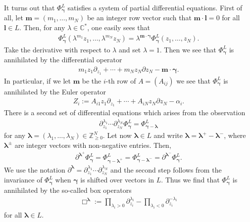 \documentclass[11pt]{article}
\numberwithin{equation}{section}
\numberwithin{equation}{section}
\begin{document}
It turns out that $\Phi_{\bm{\gamma}}^L$ satisfies a system of partial differential equations. First of all, let $\bm{m}=
(m_1,\dots,m_N)$ be an integer row vector such that $\bm{m}\cdot\bm{l}=0$ for all $\bm{l}\in L$.
Then, for any $\lambda \in \mathbb{C}^*$, one easily sees that
\begin{gather*}
\Phi_{\bm{\gamma}}^L(\lambda^{m_1}z_1,\dots,\lambda^{m_N}z_N)=
\lambda^{\bm{m}\cdot\bm{\gamma}}\Phi_{\bm{\gamma}}^L(z_1,\dots,z_N).
\end{gather*}
Take the derivative with respect to $\lambda$ and set $\lambda=1$. Then we see that
$\Phi_{\bm{\gamma}}^L$ is annihilated by the differential operator
\begin{gather*}
m_1z_1\partial_{z_1}+\cdots+m_Nz_N\partial{z_N}-\bm{m}\cdot\bm{\gamma}.
\end{gather*}
In particular, if we let $\bm{m}$ be the $i$-th row of $A=(A_{ij})$ we see
that $\Phi_{\bm{\gamma}}^L$ is annihilated by the Euler operator
\begin{gather*}
Z_i:=A_{i1}z_1\partial_{z_1}+\cdots+A_{iN}z_N\partial{z_N}-\alpha_i.
\end{gather*}
There is a second set of differential equations which arises from the
observation
\begin{gather*}
\partial_{z_1}^{\lambda_1}\cdots\partial_{z_N}^{\lambda_N}\Phi_{\bm{\gamma}}^L
=\Phi_{\bm{\gamma}-\bm{\lambda}}^L
\end{gather*}
for any $\bm{\lambda}=(\lambda_1,\dots,\lambda_N)\in\mathbb{Z}_{\ge0}^N$.
Let now $\bm{\lambda}\in L$ and write $\bm{\lambda}=\bm{\lambda}^+-\bm{\lambda}^-$,
where $\bm{\lambda}^\pm$ are integer vectors with non-negative entries. Then,
\begin{gather*}
\partial^{\bm{\lambda}^+}\Phi_{\bm{\gamma}}^L
=\Phi_{\bm{\gamma}-\bm{\lambda}^+}^L=\Phi_{\bm{\gamma}-\bm{\lambda}^-}^L
=\partial^{\bm{\lambda}^-}\Phi_{\bm{\gamma}}^L.
\end{gather*}
We use the notation $\partial^{\bm{\lambda}}=\partial_{z_1}^{\lambda_1}
\cdots\partial_{z_N}^{\lambda_N}$ and the second step follows from the invariance
of $\Phi_{\bm{\gamma}}^L$ when $\bm{\gamma}$ is shifted over vectors in $L$.
Thus we find that $\Phi_{\bm{\gamma}}^L$ is annihilated by the so-called box operators
\begin{gather*}
\Box^{\bm \lambda}:=\prod_{\lambda_i>0}\partial_{z_i}^{\lambda_i}-\prod_{\lambda_i<0}
\partial_{z_i}^{-\lambda_i}
\end{gather*}
for all $\bm{\lambda}\in L$.
\end{document}

